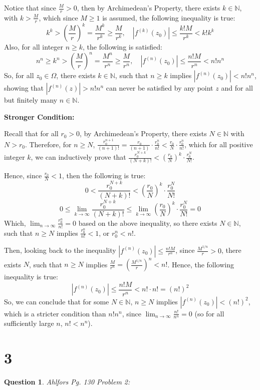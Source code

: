 \documentclass{article}
\newtheorem{question}{Question}
\begin{document}
Notice that since $\frac{M}{r}>0$, then by Archimedean's Property, there exists $k\in\mathbb{N}$, with $k> \frac{M}{r}$,
which since $M\geq 1$ is assumed, the following inequality is true:
$$k^k > \left(\frac{M}{r}\right)^k = \frac{M^k}{r^k} \geq \frac{M}{r^k},\quad |f^{(k)}(z_0)| \leq \frac{k!M}{r^k} < k!k^k$$
Also, for all integer $n\geq k$, the following is satisfied:
$$n^n \geq k^n > \left(\frac{M}{r}\right)^n = \frac{M^n}{r^n} \geq \frac{M}{r^n},\quad |f^{(n)}(z_0)| \leq \frac{n!M}{r^n} < n!n^n$$
So, for all $z_0\in\Omega$, there exists $k\in\mathbb{N}$, such that $n\geq k$ implies $|f^{(n)}(z_0)| < n!n^n$, showing that $|f^{(n)}(z)| > n!n^n$ can never be satisfied by any point $z$ and for all but finitely many $n\in\mathbb{N}$.

\hfill

\textbf{Stronger Condition:}

Recall that for all $r_0>0$, by Archimedean's Property, there exists $N\in\mathbb{N}$ with $N>r_0$. Therefore, for $n\geq N$,
$\frac{r_0^{n+1}}{(n+1)!}  = \frac{r_0}{(n+1)}\cdot \frac{r_0^n}{n!} < \frac{r_0}{N}\cdot \frac{r_0^n}{n!}$, which for all positive integer $k$, we can inductively prove that
$\frac{r_0^{N+k}}{(N+k)!} < \left(\frac{r_0}{N}\right)^k\cdot\frac{r_0^N}{N!}$. 

Hence, since $\frac{r_0}{N}<1$, then the following is true:
$$0 < \frac{r_0^{N+k}}{(N+k)!} < \left(\frac{r_0}{N}\right)^k\cdot \frac{r_0^N}{N!}$$
$$0 \leq \lim_{k\rightarrow \infty} \frac{r_0^{N+k}}{(N+k)!} \leq \lim_{k\rightarrow \infty} \left(\frac{r_0}{N}\right)^k\cdot \frac{r_0^N}{N!} = 0$$
Which, $\lim_{n\rightarrow \infty}\frac{r_0^n}{n!} = 0$ based on the above inequality, so there exists $N\in\mathbb{N}$, such that $n\geq N$ implies $\frac{r_0^n}{n!} <1$, or $r_0^n < n!$.

Then, looking back to the inequality $|f^{(n)}(z_0)| \leq \frac{n!M}{r^n}$, since $\frac{M^{1/n}}{r}>0$, there exists $N$, such that $n\geq N$ implies $\frac{M}{r^n}=\left(\frac{M^{1/n}}{r}\right)^n < n!$. Hence, the following inequality is true:
$$|f^{(n)}(z_0)| \leq \frac{n!M}{r^n}  < n!\cdot n! = (n!)^2$$
So, we can conclude that for some $N\in\mathbb{N}$, $n\geq N$ implies $|f^{(n)}(z_0)| < (n!)^2$,
which is a stricter condition than $n!n^n$, since $\lim_{n\rightarrow\infty}\frac{n!}{n^n}=0$ (so for all sufficiently large $n$, $n!<n^n$).

\break

\section*{3}
\begin{myBox}[]{}
    \begin{question}
        Ahlfors Pg. 130 Problem 2:

    \end{question}
\end{myBox}
\end{document}

